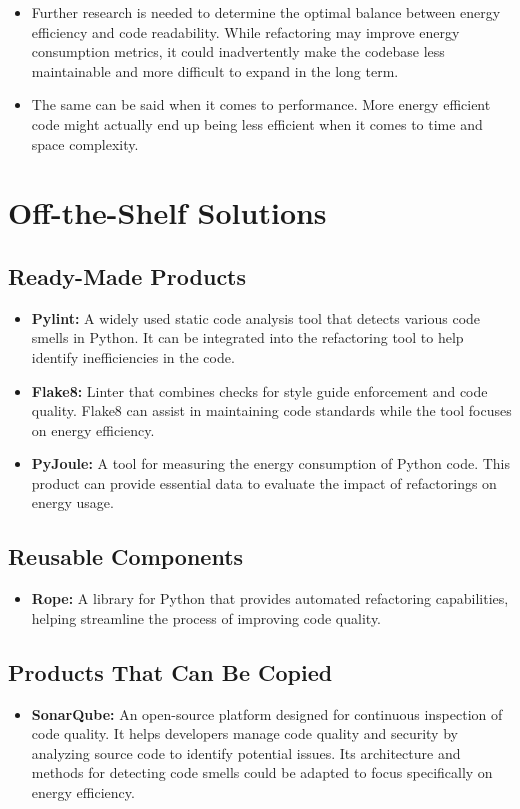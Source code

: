 \documentclass[12pt]{article}
\begin{document}
\begin{itemize}
  \item Further research is needed to determine the optimal balance
    between energy efficiency and code readability. While refactoring
    may improve energy consumption metrics, it could inadvertently
    make the codebase less maintainable and more difficult to expand
    in the long term.
  \item The same can be said when it comes to performance. More
    energy efficient code might actually end up being less efficient
    when it comes to time and space complexity.
\end{itemize}

\section{Off-the-Shelf Solutions}
\subsection{Ready-Made Products}

\begin{itemize}
  \item \textbf{Pylint:} A widely used static code analysis tool that
    detects various code smells in Python. It can be integrated into
    the refactoring tool to help identify inefficiencies in the code.
  \item \textbf{Flake8:} Linter that combines checks for style guide
    enforcement and code quality. Flake8 can assist in maintaining
    code standards while the tool focuses on energy efficiency.
  \item \textbf{PyJoule:} A tool for measuring the energy consumption
    of Python code. This product can provide essential data to
    evaluate the impact of refactorings on energy usage.
\end{itemize}

\subsection{Reusable Components}
\begin{itemize}
  \item \textbf{Rope:} A library for Python that provides automated
    refactoring capabilities, helping streamline the process of
    improving code quality.
\end{itemize}
\subsection{Products That Can Be Copied}
\begin{itemize}
  \item \textbf{SonarQube:} An open-source platform designed for
    continuous inspection of code quality. It helps developers manage
    code quality and security by analyzing source code to identify
    potential issues. Its architecture and methods for detecting code
    smells could be adapted to focus specifically on energy efficiency.
\end{itemize}
\end{document}
